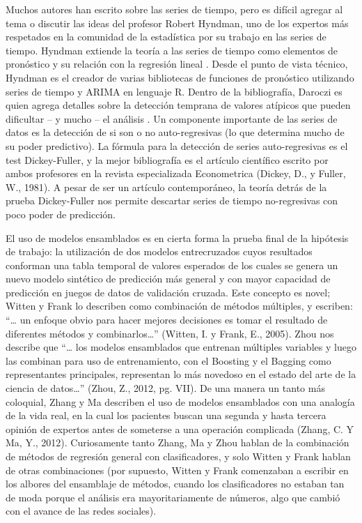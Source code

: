Muchos autores han escrito sobre las series de tiempo, pero es difícil agregar al tema o discutir las ideas del profesor Robert Hyndman, uno de los expertos más respetados en la comunidad de la estadística por su trabajo en las series de tiempo. Hyndman extiende la teoría a las series de tiempo como elementos de pronóstico y su relación con la regresión lineal \cite{hyndman}. Desde el punto de vista técnico, Hyndman es el creador de varias bibliotecas de funciones de pronóstico utilizando series de tiempo y ARIMA en lenguaje R. Dentro de la bibliografía, Daroczi es quien agrega detalles sobre la detección temprana de valores atípicos que pueden dificultar – y mucho – el análisis \cite{daroczi}. Un componente importante de las series de datos es la detección de si son o no auto-regresivas (lo que determina mucho de su poder predictivo). La fórmula para la detección de series auto-regresivas es el test Dickey-Fuller, y la mejor bibliografía es el artículo científico escrito por ambos profesores en la revista especializada Econometrica (Dickey, D., y Fuller, W., 1981). A pesar de ser un artículo contemporáneo, la teoría detrás de la prueba Dickey-Fuller nos permite descartar series de tiempo no-regresivas con poco poder de predicción.
 
El uso de modelos ensamblados es en cierta forma la prueba final de la hipótesis de trabajo: la utilización de dos modelos entrecruzados cuyos resultados conforman una tabla temporal de valores esperados de los cuales se genera un nuevo modelo sintético de predicción más general y con mayor capacidad de predicción en juegos de datos de validación cruzada. Este concepto es novel; Witten y Frank lo describen como combinación de métodos múltiples, y escriben: “… un enfoque obvio para hacer mejores decisiones es tomar el resultado de diferentes métodos y combinarlos…” (Witten, I. y Frank, E., 2005). Zhou nos describe que “… los modelos ensamblados que entrenan múltiples variables y luego las combinan para uso de entrenamiento, con el Boosting y el Bagging como representantes principales, representan lo más novedoso en el estado del arte de la ciencia de datos…” (Zhou, Z., 2012, pg. VII). De una manera un tanto más coloquial, Zhang y Ma describen el uso de modelos ensamblados con una analogía de la vida real, en la cual los pacientes buscan una segunda y hasta tercera opinión de expertos antes de someterse a una operación complicada (Zhang, C. Y Ma, Y., 2012). Curiosamente tanto Zhang, Ma y Zhou hablan de la combinación de métodos de regresión general con clasificadores, y solo Witten y Frank hablan de otras combinaciones (por supuesto, Witten y Frank comenzaban a escribir en los albores del ensamblaje de métodos, cuando los clasificadores no estaban tan de moda porque el análisis era mayoritariamente de números, algo que cambió con el avance de las redes sociales).


